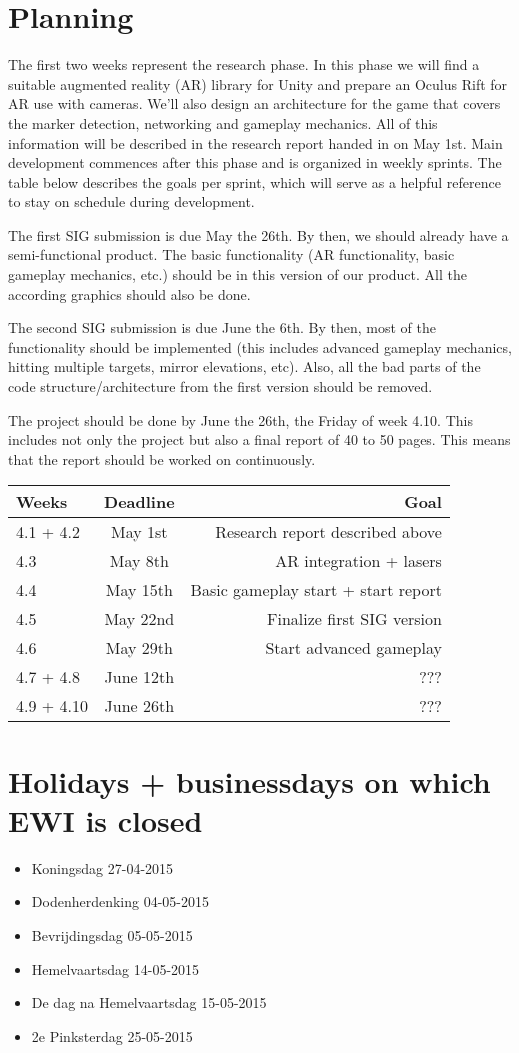 \section{Planning}

The first two weeks represent the research phase. In this phase we will find a suitable augmented reality (AR) library for Unity and prepare an Oculus Rift for AR use with cameras. We'll also design an architecture for the game that covers the marker detection, networking and gameplay mechanics. All of this information will be described in the research report handed in on May 1st. Main development commences after this phase and is organized in weekly sprints. The table below describes the goals per sprint, which will serve as a helpful reference to stay on schedule during development.

The first SIG submission is due May the 26th. By then, we should already have a semi-functional product. The basic functionality (AR functionality, basic gameplay mechanics, etc.) should be in this version of our product. All the according graphics should also be done.

The second SIG submission is due June the 6th. By then, most of the functionality should be implemented (this includes advanced gameplay mechanics, hitting multiple targets, mirror elevations, etc). Also, all the bad parts of the code structure/architecture from the first version should be removed.

The project should be done by June the 26th, the Friday of week 4.10. This includes not only the project but also a final report of 40 to 50 pages. This means that the report should be worked on continuously.

\begin{tabular}{|l|c|r|}
	\hline
	Weeks & Deadline & Goal \\ \hline
	4.1 + 4.2 & May 1st & Research report described above \\ \hline
	4.3 & May 8th & AR integration + lasers \\ \hline
	4.4 & May 15th & Basic gameplay start + start report \\ \hline
	4.5 & May 22nd & Finalize first SIG version \\ \hline
	4.6 & May 29th & Start advanced gameplay \\ \hline
	4.7 + 4.8 & June 12th & ??? \\ \hline
	4.9 + 4.10 & June 26th & ??? \\ \hline
\end{tabular}

\section{Holidays + businessdays on which EWI is closed}
\begin{itemize}
	\item Koningsdag 27-04-2015
	\item Dodenherdenking 04-05-2015
	\item Bevrijdingsdag 05-05-2015
	\item Hemelvaartsdag 14-05-2015
	\item De dag na Hemelvaartsdag 15-05-2015
	\item 2e Pinksterdag 25-05-2015
\end{itemize}